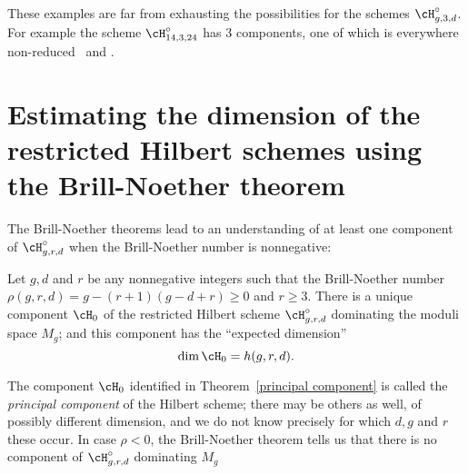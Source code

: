 These examples are far from exhausting the possibilities for the schemes $\cH^{\circ}_{g,3,d}$. For example
the scheme $\cH^{\circ}_{14,3,24}$ has 3 components, one of which is everywhere non-reduced~\cite{Mumford1962} and
\cite{Nasu2008}.


\section{Estimating the dimension of the restricted Hilbert schemes using the Brill-Noether theorem}\label{estimating dim hilb}

The Brill-Noether theorems lead to an understanding of at least one component of $\cH^{\circ}_{g,r,d}$ when
the Brill-Noether number is nonnegative:

\begin{theorem}\label{principal component}
Let $g, d$ and $r$ be any nonnegative integers such that the Brill-Noether number  $\rho(g,r,d) = g - (r+1)(g-d+r) \geq 0$
and $r\geq 3$.  There is a unique component $\cH_0$ of the restricted Hilbert scheme $\cH^\circ_{g,r,d}$ dominating the moduli space $M_g$; and this component has the ``expected dimension''
$$
\dim \cH_0 = h(g,r,d).
$$
\end{theorem}

 The component $\cH_0$ identified in Theorem~\ref{principal component} is called the \emph{principal component} of the Hilbert scheme; there may be others as well, of possibly different dimension, and we do not know precisely for which $d,g$ and $r$ these occur. In case $\rho < 0$, the Brill-Noether theorem tells us that there is no component of $\cH^\circ_{g,r,d}$ dominating $M_g$


